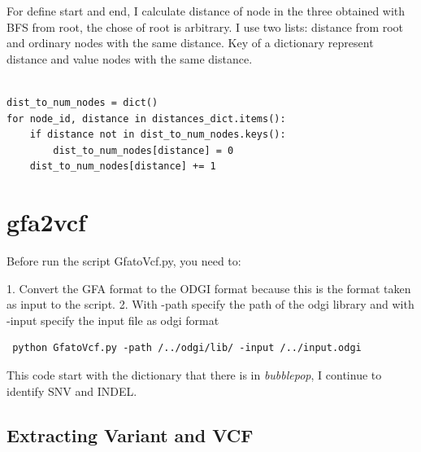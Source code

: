 For define start and end, I calculate distance of node in the three obtained with BFS from root, the chose of root is arbitrary. I use two lists: distance from root and ordinary nodes with the same distance.
Key of a dictionary represent distance and value nodes with the same distance. 

\begin{verbatim}
    
dist_to_num_nodes = dict()   
for node_id, distance in distances_dict.items():
    if distance not in dist_to_num_nodes.keys():   
        dist_to_num_nodes[distance] = 0
    dist_to_num_nodes[distance] += 1

\end{verbatim}

\section{gfa2vcf}

Before run the script GfatoVcf.py, you need to:

1. Convert the GFA format to the ODGI format because this is the format taken as input to the script.
2. With -path specify the path of the odgi library and with -input specify the input file as odgi format

\begin{verbatim}
 python GfatoVcf.py -path /../odgi/lib/ -input /../input.odgi   
\end{verbatim}
    
This code start with the dictionary that there is in \textit{bubblepop}, I continue to identify SNV and INDEL.
\subsection{Extracting Variant and VCF}

